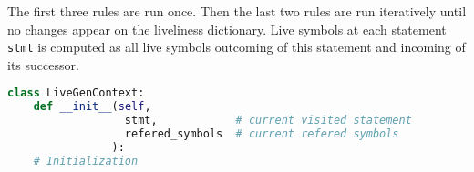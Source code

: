 The first three rules are run once. Then the last two rules are run iteratively until no changes appear on the liveliness dictionary. Live symbols at each statement \texttt{stmt} is computed as all live symbols outcoming of this statement and incoming of its successor.

\begin{lstlisting}[language = python, caption={Liveliness generator context}, label={listing:live-gen-context}]
  class LiveGenContext:
    def __init__(self, 
                  stmt,            # current visited statement
                  refered_symbols  # current refered symbols
                ):
    # Initialization
\end{lstlisting}
